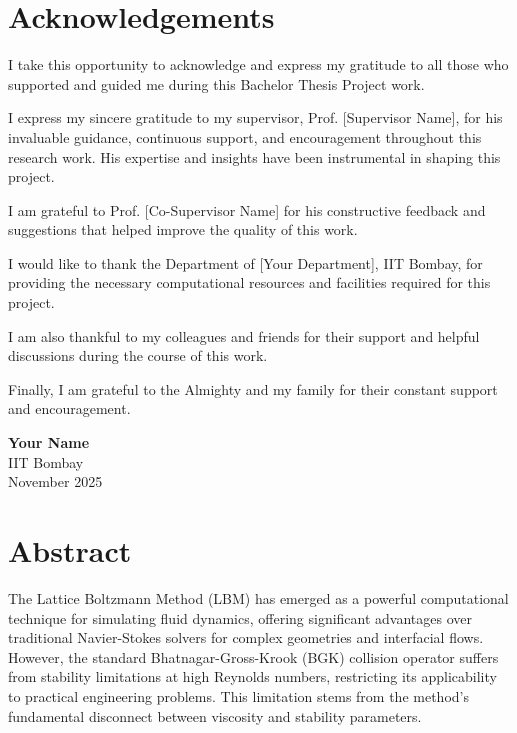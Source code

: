 \documentclass[12pt, a4paper, twoside, openright]{report}
\theoremstyle{definition}
\theoremstyle{remark}
\newcommand\myemptypage{
    \null
    \thispagestyle{empty}
    \addtocounter{page}{-1}
    \newpage
}
\def\authorname{Your Name}
\begin{document}
\myemptypage

\chapter*{Acknowledgements}

I take this opportunity to acknowledge and express my gratitude to all those who supported and guided me during this Bachelor Thesis Project work.

I express my sincere gratitude to my supervisor, Prof. [Supervisor Name], for his invaluable guidance, continuous support, and encouragement throughout this research work. His expertise and insights have been instrumental in shaping this project.

I am grateful to Prof. [Co-Supervisor Name] for his constructive feedback and suggestions that helped improve the quality of this work.

I would like to thank the Department of [Your Department], IIT Bombay, for providing the necessary computational resources and facilities required for this project.

I am also thankful to my colleagues and friends for their support and helpful discussions during the course of this work.

Finally, I am grateful to the Almighty and my family for their constant support and encouragement.

\vspace{2cm}

\noindent
\begin{flushleft}
\textbf{\authorname}\\
IIT Bombay\\
November 2025
\end{flushleft}

\myemptypage

\chapter*{Abstract}

The Lattice Boltzmann Method (LBM) has emerged as a powerful computational technique for simulating fluid dynamics, offering significant advantages over traditional Navier-Stokes solvers for complex geometries and interfacial flows. However, the standard Bhatnagar-Gross-Krook (BGK) collision operator suffers from stability limitations at high Reynolds numbers, restricting its applicability to practical engineering problems. This limitation stems from the method's fundamental disconnect between viscosity and stability parameters.
\end{document}
